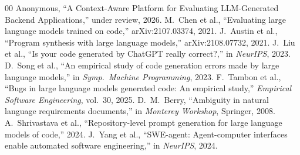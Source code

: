 \documentclass[conference]{IEEEtran}
\begin{document}
\begin{thebibliography}{00}
 Anonymous, ``A Context-Aware Platform for Evaluating LLM-Generated Backend Applications,'' under review, 2026.
 M.~Chen et al., ``Evaluating large language models trained on code,'' arXiv:2107.03374, 2021.
 J.~Austin et al., ``Program synthesis with large language models,'' arXiv:2108.07732, 2021.
 J.~Liu et al., ``Is your code generated by ChatGPT really correct?,'' in \emph{NeurIPS}, 2023.
 D.~Song et al., ``An empirical study of code generation errors made by large language models,'' in \emph{Symp.\ Machine Programming}, 2023.
 F.~Tambon et al., ``Bugs in large language models generated code: An empirical study,'' \emph{Empirical Software Engineering}, vol.~30, 2025.
 D.~M.~Berry, ``Ambiguity in natural language requirements documents,'' in \emph{Monterey Workshop}, Springer, 2008.
 A.~Shrivastava et al., ``Repository-level prompt generation for large language models of code,'' 2024.
 J.~Yang et al., ``SWE-agent: Agent-computer interfaces enable automated software engineering,'' in \emph{NeurIPS}, 2024.
\end{thebibliography}
\end{document}
